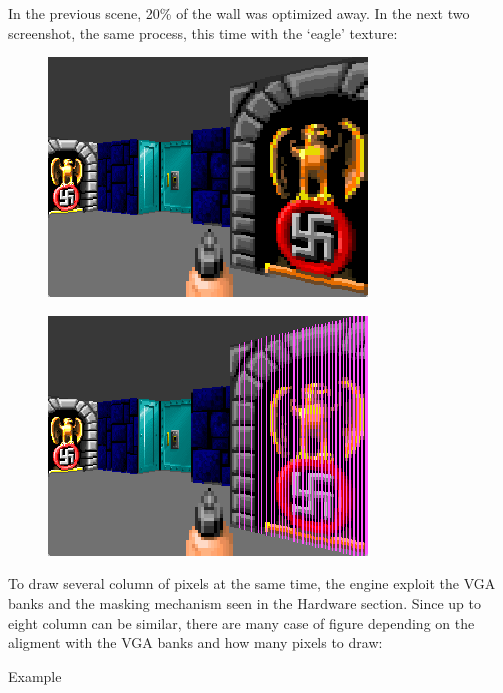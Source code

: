 In the previous scene, 20\% of the wall was optimized away. In the next two screenshot, the same process, this time with the `eagle' texture:
\begin{figure}[H]
 \centering
 \includegraphics[scale=1.3]{imgs/post_optimization_2_show.png}
\end{figure}


\begin{figure}[H]
 \centering
 \includegraphics[scale=1.3]{imgs/post_optimization_2_pink_show.png}
\end{figure}
 
To draw several column of pixels at the same time, the engine exploit the VGA banks and the masking mechanism seen in the Hardware section.
Since up to eight column can be similar, there are many case of figure depending on the aligment with the VGA banks and how many pixels to draw:

Example
 
